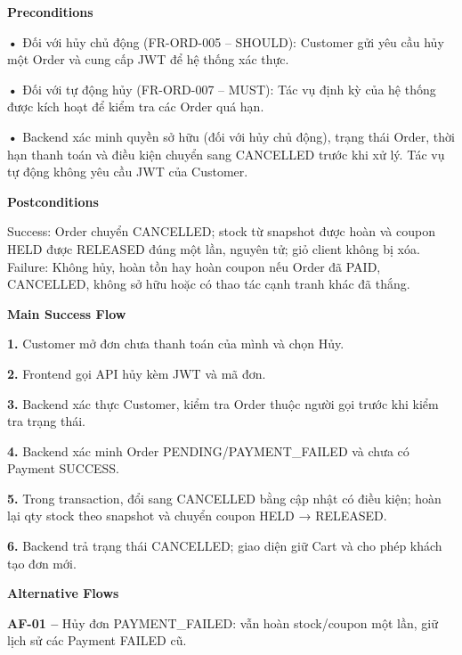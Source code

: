 \documentclass[11pt,a4paper,oneside]{report}
\begin{document}
\par\smallskip\noindent\textcolor{sgublue}{\textbf{Preconditions}}\par\nobreak
\textbf{•} Đối với hủy chủ động (FR-ORD-005 -- SHOULD): Customer gửi yêu cầu hủy một Order và cung cấp JWT để hệ thống xác thực.

\textbf{•} Đối với tự động hủy (FR-ORD-007 -- MUST): Tác vụ định kỳ của hệ thống được kích hoạt để kiểm tra các Order quá hạn.

\textbf{•} Backend xác minh quyền sở hữu (đối với hủy chủ động), trạng thái Order, thời hạn thanh toán và điều kiện chuyển sang CANCELLED trước khi xử lý. Tác vụ tự động không yêu cầu JWT của Customer.
\par

\par\smallskip\noindent\textcolor{sgublue}{\textbf{Postconditions}}\par\nobreak
Success: Order chuyển CANCELLED; stock từ snapshot được hoàn và coupon HELD được RELEASED đúng một lần, nguyên tử; giỏ client không bị xóa.\\
Failure: Không hủy, hoàn tồn hay hoàn coupon nếu Order đã PAID, CANCELLED, không sở hữu hoặc có thao tác cạnh tranh khác đã thắng.\strut
\par

\par\smallskip\noindent\textcolor{sgublue}{\textbf{Main Success Flow}}\par\nobreak
\textbf{1.} Customer mở đơn chưa thanh toán của mình và chọn Hủy.

\textbf{2.} Frontend gọi API hủy kèm JWT và mã đơn.

\textbf{3.} Backend xác thực Customer, kiểm tra Order thuộc người gọi trước khi kiểm tra trạng thái.

\textbf{4.} Backend xác minh Order PENDING/PAYMENT\_FAILED và chưa có Payment SUCCESS.

\textbf{5.} Trong transaction, đổi sang CANCELLED bằng cập nhật có điều kiện; hoàn lại qty stock theo snapshot và chuyển coupon HELD → RELEASED.

\textbf{6.} Backend trả trạng thái CANCELLED; giao diện giữ Cart và cho phép khách tạo đơn mới.
\par

\par\smallskip\noindent\textcolor{sgublue}{\textbf{Alternative Flows}}\par\nobreak
\textbf{AF-01 --} Hủy đơn PAYMENT\_FAILED: vẫn hoàn stock/coupon một lần, giữ lịch sử các Payment FAILED cũ.
\end{document}
